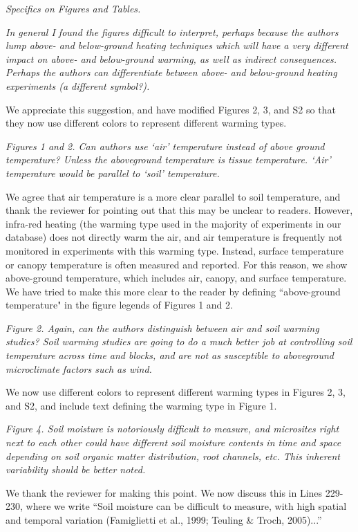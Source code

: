 \documentclass[11pt,a4paper]{letter}
\begin{document}
\begin{letter}{}
\par \emph{Specifics on Figures and Tables.}
\par \emph{In general I found the figures difficult to interpret, perhaps because the authors lump above- and below-ground heating techniques which will have a very different impact on above- and below-ground warming, as well as indirect consequences.  Perhaps the authors can differentiate between above- and below-ground heating experiments (a different symbol?).}
\par We appreciate this suggestion, and have modified Figures 2, 3, and S2 so that they now use different colors  to represent different warming types.

\par \emph{Figures 1 and 2. Can authors use `air' temperature instead of above ground temperature? Unless the aboveground temperature is tissue temperature.  `Air' temperature would be parallel to `soil' temperature. }
\par We agree that air temperature is a more clear parallel to soil temperature, and thank the reviewer for pointing out that this may be unclear to readers. However, infra-red heating (the warming type used in the majority of experiments in our database)  does not directly warm the air, and air temperature is frequently not monitored in experiments with this warming type. Instead, surface temperature or canopy temperature is often measured and reported. For this reason, we show above-ground temperature, which includes air, canopy, and surface temperature. We have tried to make this more clear to the reader by defining ``above-ground temperature" in the figure legends of Figures 1 and 2.

\par \emph{Figure 2.  Again, can the authors distinguish between air and soil warming studies?  Soil warming studies are going to do a much better job at controlling soil temperature across time and blocks, and are not as susceptible to aboveground microclimate factors such as wind.}
\par We now use different colors to represent different warming types in Figures 2, 3, and S2, and include text defining the warming type in Figure 1.

\par \emph{Figure 4.  Soil moisture is notoriously difficult to measure, and microsites right next to each other could have different soil moisture contents in time and space depending on soil organic matter distribution, root channels, etc.  This inherent variability should be better noted.}
\par We thank the reviewer for making this point. We now discuss this in Lines 229-230, where we write ``Soil moisture can be difficult to measure, with high spatial and temporal variation (Famiglietti et al., 1999; Teuling \& Troch, 2005)...''


\end{letter}
\end{document}
